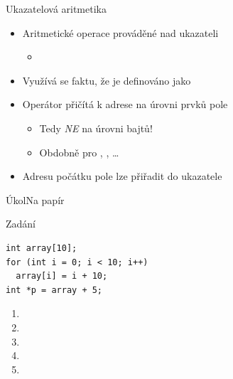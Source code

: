\begin{frame}{Ukazatelová aritmetika}

  \begin{itemize}
    \item Aritmetické operace prováděné nad ukazateli
    \begin{itemize}
      \item {}
    \end{itemize}

    \pause

    \item Využívá se faktu, že  je definováno jako

    \pause

    \item Operátor \code{+} přičítá k adrese na úrovni prvků pole
    \begin{itemize}
      \item Tedy \emph{NE} na úrovni bajtů!
      \item Obdobně pro \code{\-}, \code{++}, \dots
    \end{itemize}

    \pause

    \item Adresu počátku pole lze přiřadit do ukazatele
  \end{itemize}

\end{frame}

\begin{frame}[fragile]{Úkol}{Na papír}

\begin{block}{Zadání}
\begin{lstlisting}
int array[10];
for (int i = 0; i < 10; i++)
  array[i] = i + 10;
int *p = array + 5;
\end{lstlisting}
\end{block}

  \medskip

  \begin{enumerate}
    \item {}
    \item {}
    \item {}
    \item {}
    \item {}
  \end{enumerate}

\end{frame}

